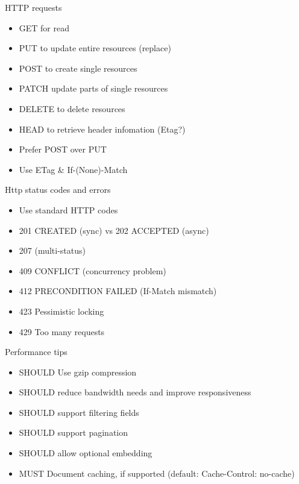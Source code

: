 \documentclass[10pt]{beamer}
\begin{document}
\begin{frame}{HTTP requests}

  \begin{itemize}

    \item
          GET for read
    \item
          PUT to update entire resources (replace)
    \item
          POST to create single resources
    \item
          PATCH update parts of single resources
    \item
          DELETE to delete resources
    \item
          HEAD to retrieve header infomation (Etag?)
    \item
          Prefer POST over PUT
    \item
          Use ETag \& If-(None)-Match
  \end{itemize}

\end{frame}

\begin{frame}{Http status codes and errors}

  \begin{itemize}

    \item
          Use standard HTTP codes
    \item
          201 CREATED (sync) vs 202 ACCEPTED (async)
    \item
          207 (multi-status)
    \item
          409 CONFLICT (concurrency problem)
    \item
          412 PRECONDITION FAILED (If-Match mismatch)
    \item
          423 Pessimistic locking
    \item
          429 Too many requests
  \end{itemize}

\end{frame}

\begin{frame}{Performance tips}

  \begin{itemize}

    \item
          SHOULD Use gzip compression
    \item
          SHOULD reduce bandwidth needs and improve responsiveness
    \item
          SHOULD support filtering fields
    \item
          SHOULD support pagination
    \item
          SHOULD allow optional embedding
    \item
          MUST Document caching, if supported (default: Cache-Control: no-cache)
  \end{itemize}

\end{frame}
\end{document}
